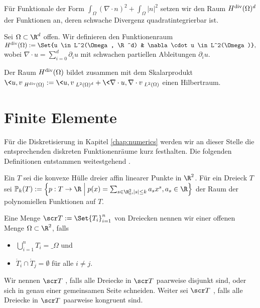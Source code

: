 \documentclass{mythesis}
\begin{document}
Für Funktionale der Form $\int_\Omega (\nabla \cdot n)^2 + \int_\Omega |n|^2$ setzen wir den Raum $H^{\mathrm{div}}(\Omega)^d$ der Funktionen an, deren schwache Divergenz quadratintegrierbar ist.

\begin{definition} \label{def:hdiv}
    Sei $\Omega \subset \R^d$ offen.
    Wir definieren den Funktionenraum
    \begin{math}
	\Hdiv(\Omega) := \Set{u \in L^2(\Omega, \R^d) & \nabla \cdot u \in L^2(\Omega)},
    \end{math}
    wobei $\nabla \cdot u = \sum_{i=0}^d \partial_i u$ mit schwachen partiellen Ableitungen $\partial_i u$.
\end{definition}

\begin{proposition} \label{lem:hdivhilbert}
    Der Raum $H^{\mathrm{div}}(\Omega)$ bildet zusammen mit dem Skalarprodukt
    \begin{math}
	\<u, v\>_{\Hdiv(\Omega)} := \<u, v\>_{L^2(\Omega)^d} + \<\nabla \cdot u, \nabla \cdot v\>_{L^2(\Omega)}
    \end{math}
    einen Hilbertraum.
\end{proposition}


\section*{Finite Elemente}

Für die Diskretisierung in Kapitel \ref{chap:numerics} werden wir an dieser Stelle die entsprechenden diskreten Funktionenräume kurz festhalten.
Die folgenden Definitionen entstammen weitestgehend \cite{haasdonk2014enumpde,heine2016fem}.

\begin{definition}
    Ein  $T$ sei die konvexe Hülle dreier affin linearer Punkte in $\R^2$.
    Für ein Dreieck $T$ sei
    \begin{math}
	\P_k(T) := \Big\{p: T \to \R \;\Big|\; p(x) = \sum_{s \in \N_0^2, |s| \le k} a_s x^s, a_s \in \R \Big\}
    \end{math}
    der Raum der polynomiellen Funktionen auf $T$.

    Eine Menge $\scr T := \Set{T_i}_{i=1}^n$ von Dreiecken nennen wir  einer offenen Menge $\Omega \subset \R^2$, falls
    \begin{itemize}
        \item
	    $\bigcup_{i=1}^n T_i = \_\Omega$ und
	\item
	    $\mathring T_i \cap \mathring T_j = \emptyset$ für alle $i \neq j$.
    \end{itemize}
    Wir nennen $\scr T$ , falls alle Dreiecke in $\scr T$ paarweise disjunkt sind, oder sich in genau einer gemeinsamen Seite schneiden.
    Weiter sei $\scr T$ , falls alle Dreiecke in $\scr T$ paarweise kongruent sind.

\end{definition}
\end{document}

